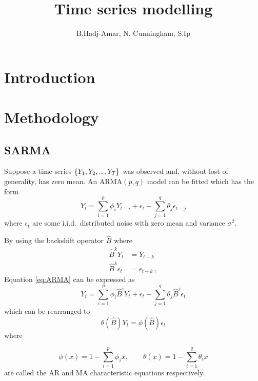 \documentclass[]{article}
\title{Time series modelling}
\author{B.Hadj-Amar, N. Cunningham, S.Ip}
\newcommand{\dotdotdot}{\vphantom{.}_{\cdots}}
\newcommand{\backshift}{\widehat{B}}
\begin{document}
\maketitle

\begin{abstract}

\end{abstract}

\section{Introduction}

\section{Methodology}

\subsection{SARMA}
Suppose a time series $\{Y_1,Y_2,\dotdotdot,Y_T\}$ was observed and, without lost of generality, has zero mean. An ARMA$(p,q)$ model can be fitted which has the form
\begin{equation}
Y_t = \sum_{i=1}^{p} \phi_i Y_{t-i} + \epsilon_t - \sum_{j=1}^{q} \theta_{j} \epsilon_{t-j}
\label{eq:ARMA}
\end{equation}
where $\epsilon_t$ are some i.i.d.~distributed noise with zero mean and variance $\sigma^2$.

By using the backshift operator $\backshift$ where
\begin{align*}
\backshift^k Y_t &= Y_{t-k} \\
\backshift^k \epsilon_t &= \epsilon_{t-k} \ ,
\end{align*}
Equation \eqref{eq:ARMA} can be expressed as
\begin{equation*}
Y_t = \sum_{i=1}^{p} \phi_i \backshift^i Y_{t} + \epsilon_t - \sum_{j=1}^{q} \theta_{j} \backshift^j \epsilon_{t}
\end{equation*}
which can be rearranged to
\begin{equation*}
\theta\left(\backshift\right)Y_t=\phi\left(\backshift\right)\epsilon_t
\end{equation*}
where


\begin{equation*}
\phi(x)=1-\sum_{i=1}^{p} \phi_i x, \qquad \theta(x)=1-\sum_{i=1}^{q} \theta_i x
\end{equation*}
are called the AR and MA characteristic equations respectively.
\vspace{0.1cm}
\end{document}
